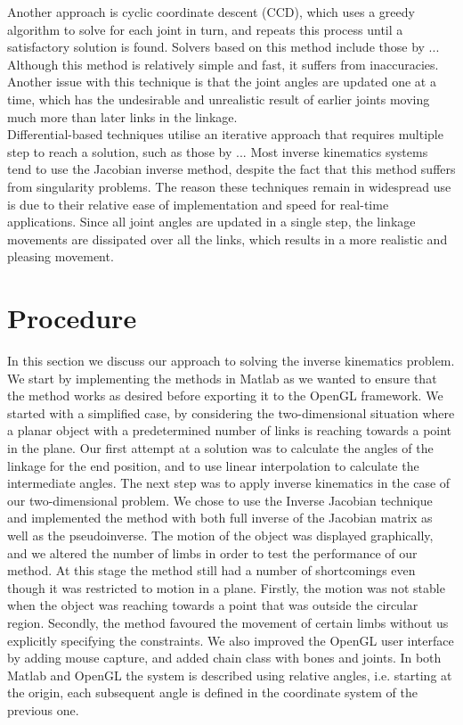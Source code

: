 \documentclass[paper=a4, fontsize=11pt]{scrartcl} %
\numberwithin{equation}{section} %
\numberwithin{figure}{section} %
\numberwithin{table}{section} %
\begin{document}
Another approach is cyclic coordinate descent (CCD), which uses a greedy algorithm to solve for each joint in turn, and repeats this process until a satisfactory solution is found. Solvers based on this method include those by ... Although this method is relatively simple and fast, it suffers from inaccuracies. Another issue with this technique is that the joint angles are updated one at a time, which has the undesirable and unrealistic result of earlier joints moving much more than later links in the linkage. \\

Differential-based techniques utilise an iterative approach that requires multiple step to reach a solution, such as those by ... Most inverse kinematics systems tend to use the Jacobian inverse method, despite the fact that this method suffers from singularity problems. The reason these techniques remain in widespread use is due to their relative ease of implementation and speed for real-time applications. Since all joint angles are updated in a single step, the linkage movements are dissipated over all the links, which results in a more realistic and pleasing movement. 




\section{Procedure}
In this section we discuss our approach to solving the inverse kinematics problem. We start by implementing the methods in Matlab as we wanted to ensure that the method works as desired before exporting it to the OpenGL framework. We started with a simplified case, by considering the two-dimensional situation where a planar object with a predetermined number of links is reaching towards a point in the plane. Our first attempt at a solution was to calculate the angles of the linkage for the end position, and to use linear interpolation to calculate the intermediate angles. The next step was to apply inverse kinematics in the case of our two-dimensional problem. We chose to use the Inverse Jacobian technique and implemented the method with both full inverse of the Jacobian matrix as well as the pseudoinverse. The motion of the object was displayed graphically, and we altered the number of limbs in order to test the performance of our method. At this stage the method still had a number of shortcomings even though it was restricted to motion in a plane. Firstly, the motion was not stable when the object was reaching towards a point that was outside the circular region. Secondly, the method favoured the movement of certain limbs without us explicitly specifying the constraints. We also improved the OpenGL user interface by adding mouse capture, and added chain class with bones and joints. In both Matlab and OpenGL the system is described using relative angles, i.e. starting at the origin, each subsequent angle is defined in the coordinate system of the previous one. \\
\end{document}
